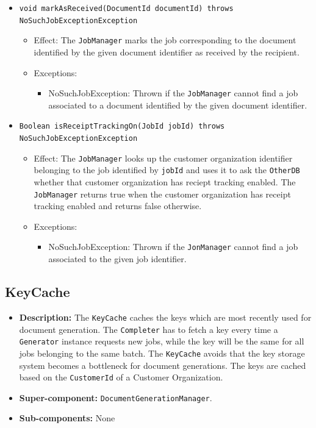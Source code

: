 \documentclass[a4paper,10pt]{article}
\begin{document}
\begin{itemize}
\begin{itemize}
    	\item \texttt{void markAsReceived(DocumentId documentId) throws NoSuchJobExceptionException}
    	\begin{itemize}
    		\item Effect: The \texttt{JobManager} marks the job corresponding to the document identified by the given document identifier as received by the recipient.
    		\item Exceptions:
    		\begin{itemize}
    			\item NoSuchJobException: Thrown if the \texttt{JobManager} cannot find a job associated to a document identified by the given document identifier.
    		\end{itemize}
    	\end{itemize}
    	
    	\item \texttt{Boolean isReceiptTrackingOn(JobId jobId) throws NoSuchJobExceptionException}
    	\begin{itemize}
    		\item Effect: The \texttt{JobManager} looks up the customer organization identifier belonging to the job identified by \texttt{jobId} and uses it to ask the \texttt{OtherDB} whether that customer organization has reciept tracking enabled. The \texttt{JobManager} returns true when the customer organization has receipt tracking enabled and returns false otherwise.
    		\item Exceptions:
    		\begin{itemize}
    			\item NoSuchJobException: Thrown if the \texttt{JonManager} cannot find a job associated to the given job identifier.
    		\end{itemize}
    	\end{itemize}   
    \end{itemize}     
\end{itemize}

\subsection{KeyCache}
\begin{itemize}
    \item \textbf{Description:} The \texttt{KeyCache} caches the keys which are most recently used for document generation. The \texttt{Completer} has to fetch a key every time a \texttt{Generator} instance requests new jobs, while the key will be the same for all jobs belonging to the same batch. The \texttt{KeyCache} avoids that the key storage system becomes a bottleneck for document generations. The keys are cached based on the \texttt{CustomerId} of a Customer Organization.
    \item \textbf{Super-component:}  \texttt{DocumentGenerationManager}.
    \item \textbf{Sub-components:} None
\end{itemize}
\end{document}
